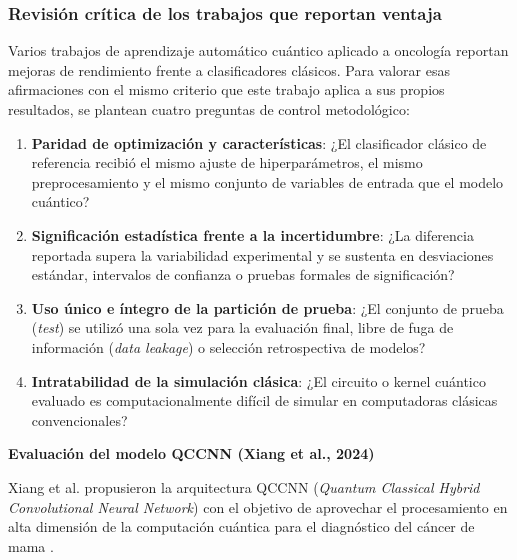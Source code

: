 
\subsubsection{Revisión crítica de los trabajos que reportan ventaja}
\label{sec:revision_critica}

Varios trabajos de aprendizaje automático cuántico aplicado a oncología reportan mejoras de rendimiento frente a clasificadores clásicos. Para valorar esas afirmaciones con el mismo criterio que este trabajo aplica a sus propios resultados, se plantean cuatro preguntas de control metodológico:

\begin{enumerate}
  \item \textbf{Paridad de optimización y características}: ¿El clasificador clásico de referencia recibió el mismo ajuste de hiperparámetros, el mismo preprocesamiento y el mismo conjunto de variables de entrada que el modelo cuántico?
  \item \textbf{Significación estadística frente a la incertidumbre}: ¿La diferencia reportada supera la variabilidad experimental y se sustenta en desviaciones estándar, intervalos de confianza o pruebas formales de significación?
  \item \textbf{Uso único e íntegro de la partición de prueba}: ¿El conjunto de prueba (\textit{test}) se utilizó una sola vez para la evaluación final, libre de fuga de información (\textit{data leakage}) o selección retrospectiva de modelos?
  \item \textbf{Intratabilidad de la simulación clásica}: ¿El circuito o kernel cuántico evaluado es computacionalmente difícil de simular en computadoras clásicas convencionales?
\end{enumerate}

\textbf{Evaluación del modelo QCCNN (Xiang et al., 2024)}

Xiang et al. propusieron la arquitectura QCCNN (\textit{Quantum Classical Hybrid Convolutional Neural Network}) con el objetivo de aprovechar el procesamiento en alta dimensión de la computación cuántica para el diagnóstico del cáncer de mama \cite{Xiang2024QuantumCNN}.

